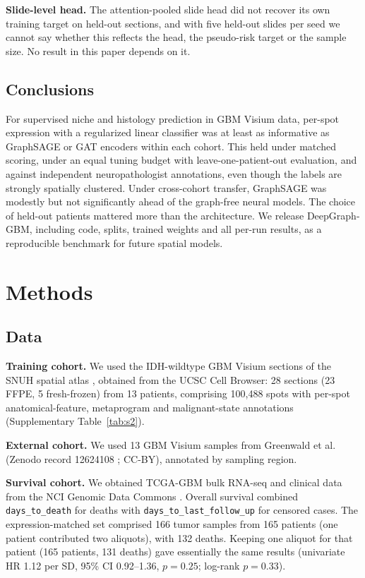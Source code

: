 \documentclass[11pt,letterpaper]{article}
\begin{document}
\textbf{Slide-level head.} The attention-pooled slide head did not recover its own training target on held-out sections, and with five held-out slides per seed we cannot say whether this reflects the head, the pseudo-risk target or the sample size. No result in this paper depends on it.

\subsection{Conclusions}

For supervised niche and histology prediction in GBM Visium data, per-spot expression with a regularized linear classifier was at least as informative as GraphSAGE or GAT encoders within each cohort. This held under matched scoring, under an equal tuning budget with leave-one-patient-out evaluation, and against independent neuropathologist annotations, even though the labels are strongly spatially clustered. Under cross-cohort transfer, GraphSAGE was modestly but not significantly ahead of the graph-free neural models. The choice of held-out patients mattered more than the architecture. We release DeepGraph-GBM, including code, splits, trained weights and all per-run results, as a reproducible benchmark for future spatial models.

\section{Methods}

\subsection{Data}

\textbf{Training cohort.} We used the IDH-wildtype GBM Visium sections of the SNUH spatial atlas \cite{park2026}, obtained from the UCSC Cell Browser: 28 sections (23 FFPE, 5 fresh-frozen) from 13 patients, comprising 100{,}488 spots with per-spot anatomical-feature, metaprogram and malignant-state annotations (Supplementary Table~\ref{tab:s2}).

\textbf{External cohort.} We used 13 GBM Visium samples from Greenwald et al.\ \cite{greenwald2024} (Zenodo record 12624108 \cite{greenwald2024data}; CC-BY), annotated by sampling region.

\textbf{Survival cohort.} We obtained TCGA-GBM bulk RNA-seq and clinical data from the NCI Genomic Data Commons \cite{tcga2008}. Overall survival combined \texttt{days\_to\_death} for deaths with \texttt{days\_to\_last\_follow\_up} for censored cases. The expression-matched set comprised 166 tumor samples from 165 patients (one patient contributed two aliquots), with 132 deaths. Keeping one aliquot for that patient (165 patients, 131 deaths) gave essentially the same results (univariate HR 1.12 per SD, 95\% CI 0.92--1.36, $p = 0.25$; log-rank $p = 0.33$).
\end{document}
